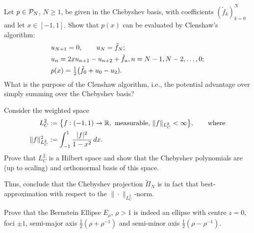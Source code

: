 \begin{exercise}
   \label{exr:poly:clenshaw}
   Let $p \in \mathcal{P}_N$, $N \geq 1$, be given in the Chebyshev basis, with
   coefficients $(\tilde{f}_k)_{k = 0}^N$ and let $x \in [-1,1]$. Show that
   $p(x)$ can be evaluated by Clenshaw's algorithm:
   \begin{align*}
      & u_{N+1} = 0, \qquad u_N = \tilde{f}_N; \\ 
      & u_n = 2 x u_{n+1} - u_{n+2} + \tilde{f}_n, n = N-1, N-2, \dots, 0; \\ 
      & p(x) = {\textstyle \frac{1}{2}} \big( \tilde{f}_0 + u_0 - u_2).   
   \end{align*}
   What is the purpose of the Clenshaw algorithm, i.e., the potential 
   advantage over simply summing over the Chebyshev basis?
\end{exercise}

\begin{exercise}[Orthogonality of $T_k$]
   Consider the weighted space 
   \begin{align*}
      L^2_C &:= \big\{ f : (-1,1) \to \mathbb{R}, \text{ measurable, } 
            \|f\|_{L^2_C} < \infty \big\}, \qquad 
            \text{where} \\  
      \|f\|_{L^2_C}^2 &:= \int_{-1}^1 \frac{|f|^2}{1 - x^2} \,dx.
   \end{align*}
   Prove that $L^2_C$ is a Hilbert space and show that the Chebyshev 
   polynomials are (up to scaling) and orthonormal basis of this space. 

   Thus, conclude that the Chebyshev projection $\tilde\Pi_N$ is in fact that 
   best-approximation with respect to the $\|\cdot\|_{L^2_C}$-norm. 
\end{exercise}

\begin{exercise} 
   \label{exr:poly:ellipse}
   Prove that the Bernstein Ellipse $E_\rho$, $\rho > 1$ is indeed an ellipse
   with centre $z = 0$, foci $\pm 1$, semi-major axis $\frac12 (\rho+\rho^{-1})$
   and semi-minor axis $\frac12 (\rho-\rho^{-1})$.
\end{exercise}



